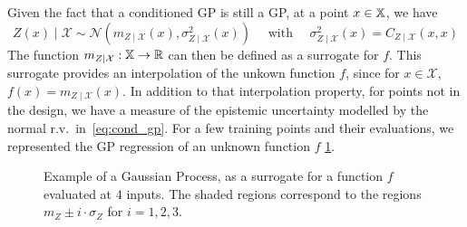 \documentclass[../../Main_ManuscritThese.tex]{subfiles}
\newcommand\imgpath{/home/victor/acadwriting/Manuscrit/Text/Chapter4/img/}
\begin{document}
Given the fact that a conditioned GP is still a GP, at a point $x \in \mathbb{X}$, we have
\begin{equation}
  \label{eq:cond_gp}
  Z(x) \mid \mathcal{X} \sim \mathcal{N}\left(m_{Z\mid \mathcal{X}}(x), \sigma^2_{Z\mid \mathcal{X}}(x)\right) \quad \text{ with } \quad \sigma^2_{Z\mid \mathcal{X}}(x) = C_{Z \mid \mathcal{X}}(x, x)
\end{equation}
The function $m_{Z \mid \mathcal{X}}: \mathbb{X} \rightarrow \mathbb{R}$ can then be defined as a surrogate for $f$. This surrogate provides an interpolation of the unkown function $f$, since for $x \in \mathcal{X}$, $f(x) = m_{Z \mid \mathcal{X}}(x)$.
In addition to that interpolation property, for points not in the design, we have a measure of the epistemic uncertainty modelled by the normal r.v.\ in~\eqref{eq:cond_gp}.
For a few training points and their evaluations, we represented the GP regression of an unknown function $f$ \cref{fig:example_GP}.

\begin{figure}[ht]
  \centering
  
  \caption[Illustration of GP regression]{\label{fig:example_GP} Example of a Gaussian Process, as a surrogate for a function $f$ evaluated at 4 inputs. The shaded regions correspond to the regions $m_Z \pm i \cdot \sigma_Z$ for $i=1, 2,3$.}
\end{figure}
\end{document}
